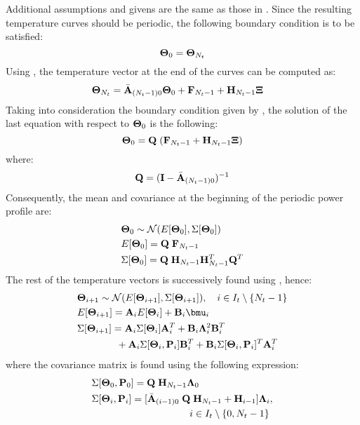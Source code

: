 Additional assumptions and givens are the same as those in . Since the resulting temperature curves should be periodic, the following boundary condition is to be satisfied:
\begin{equation} \equlabel{dss-boundary}
  \vtemperature_0 = \vtemperature_{\stepcount}
\end{equation}
Using , the temperature vector at the end of the curves can be computed as:
\begin{align*}
  \mathbf{\Theta}_{N_t} & = \Bar{\mathbf{A}}_{(N_t - 1)0} \mathbf{\Theta}_0 + \mathbf{F}_{N_t - 1} + \mathbf{H}_{N_t - 1} \mathbf{\Xi}
\end{align*}
Taking into consideration the boundary condition given by , the solution of the last equation with respect to $\mathbf{\Theta}_0$ is the following:
\[
  \mathbf{\Theta}_0 = \mathbf{Q} \; (\mathbf{F}_{N_t - 1} + \mathbf{H}_{N_t - 1} \mathbf{\Xi})
\]
where:
\begin{equation} \equlabel{q}
  \m{Q} = (\mone - \am{A}_{(\stepcount - 1)0})^{-1}
\end{equation}
Consequently, the mean and covariance at the beginning of the periodic power profile are:
\begin{align*}
  & \mathbf{\Theta}_0 \sim \mathcal{N}(E[\mathbf{\Theta}_0], \Sigma[\mathbf{\Theta}_0]) \\
  & E[\mathbf{\Theta}_0] = \mathbf{Q} \; \mathbf{F}_{N_t - 1} \\
  & \Sigma[\mathbf{\Theta}_0] = \mathbf{Q} \; \mathbf{H}_{N_t - 1} \mathbf{H}_{N_t - 1}^T \mathbf{Q}^T
\end{align*}
The rest of the temperature vectors is successively found using , hence:
\begin{align*}
  & \vtemperature_{i + 1} \sim \normal(\expectation{\vtemperature_{i + 1}}, \covariance{\vtemperature_{i + 1}}), \sep i \in \timeindex \setminus \{\stepcount - 1\} \\
  & \expectation{\vtemperature_{i + 1}} = \m{A}_i \expectation{\vtemperature_i} + \m{B}_i \vmean{i} \\
  & \covariance{\vtemperature_{i + 1}} = \m{A}_i \covariance{\vtemperature_i} \m{A}_i^T + \m{B}_i \ddeviation{i}^2 \m{B}_i^T \\
  & {} \qquad \qquad + \m{A}_i \covariance{\vtemperature_i, \vpower_i} \m{B}_i^T + \m{B}_i \covariance{\vtemperature_i, \vpower_i}^T \m{A}_i^T
\end{align*}
where the covariance matrix is found using the following expression:
\begin{align*}
  & \Sigma[\mathbf{\Theta}_0, \mathbf{P}_0] = \mathbf{Q} \; \mathbf{H}_{N_t - 1} \mathbf{\Lambda}_{0} \\
  & \Sigma[\mathbf{\Theta}_i, \mathbf{P}_i] = [ \Bar{\mathbf{A}}_{(i - 1)0} \; \mathbf{Q} \; \mathbf{H}_{N_t - 1} + \mathbf{H}_{i - 1}] \mathbf{\Lambda}_{i}, \\
  & \qquad \qquad \qquad \qquad \qquad i \in I_t \setminus \{0, N_t - 1\}
\end{align*}

